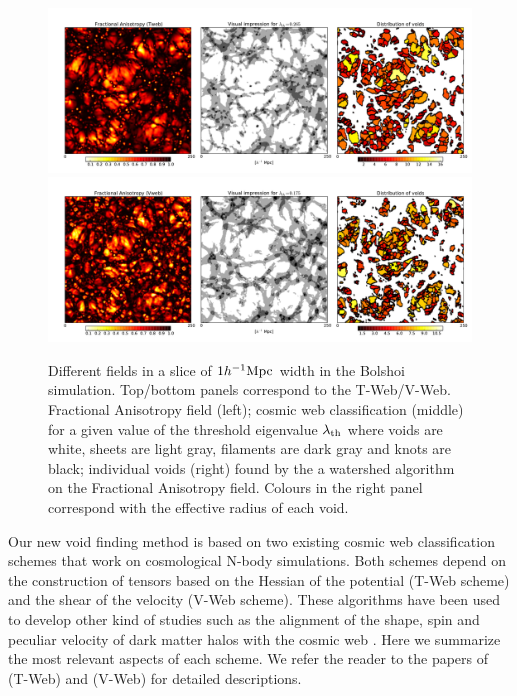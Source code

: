 \documentclass[a4,useAMS,usenatbib,usegraphicx]{mn2e}
\newcommand{\hMpc}{{\ifmmode{h^{-1}{\rm Mpc}}\else{$h^{-1}$Mpc}\fi}}
\begin{document}
\begin{figure}
  \includegraphics[trim = 16mm 8mm 5mm 12mm, clip, keepaspectratio=true,
  width=0.73\textheight]{cosmicweb_FA_Tweb.pdf}
  \includegraphics[trim = 16mm 8mm 5mm 12mm, clip, keepaspectratio=true,
  width=0.73\textheight]{cosmicweb_FA_Vweb.pdf}
  \caption{Different fields in a slice of
    $1\hMpc$ width in the Bolshoi simulation. Top/bottom panels correspond
    to the T-Web/V-Web.      
    Fractional Anisotropy field (left); cosmic web classification
    (middle) for a given value of the threshold eigenvalue
    $\lambda_{\rm th}$ where voids are white, sheets are light gray,
    filaments are dark gray and knots are black; individual voids (right) found by 
    the a watershed algorithm on the Fractional Anisotropy field. Colours
    in the right panel correspond with the effective radius of each void. }
  \label{fig:FA_field}
\end{figure}

Our new void finding method is based on two existing cosmic web
classification schemes that work on cosmological N-body simulations.
Both schemes depend on the construction of tensors based on the
Hessian of the potential (T-Web scheme) and the shear of the velocity
(V-Web scheme). 
These algorithms have been used to develop other
kind of studies such as the alignment of the shape, spin and peculiar
velocity of dark matter halos with the cosmic web
\citep{Libeskind13,Forero2014}. 
Here we summarize the most relevant aspects of each scheme. 
We refer the reader to the papers of \cite{Forero09} (T-Web) and
\cite{Hoffman12} (V-Web) for detailed descriptions.  
\end{document}
